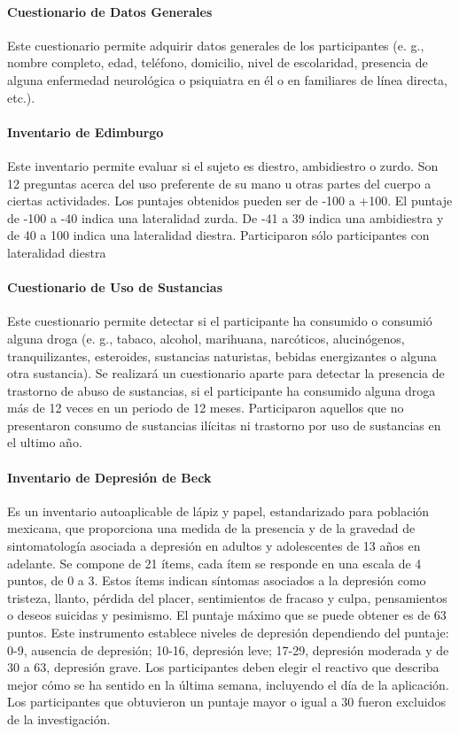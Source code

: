 \documentclass[12pt,letterpaper,final]{article}
\let\cite\cite %
\begin{document}
\paragraph{Cuestionario de Datos Generales} Este cuestionario permite adquirir datos generales de los participantes (e. g., nombre completo, edad, teléfono, domicilio, nivel de escolaridad, presencia de alguna enfermedad neurológica o psiquiatra en él o en familiares de línea directa, etc.).

\paragraph[Inventario de Edimburgo]{Inventario de Edimburgo \cite{Oldfield1971}} Este inventario permite evaluar si el sujeto es diestro, ambidiestro o zurdo. Son 12 preguntas acerca del uso preferente de su mano u otras partes del cuerpo a ciertas actividades. Los puntajes obtenidos pueden ser de -100 a +100. El puntaje de -100 a -40 indica una lateralidad zurda. De -41 a 39 indica una ambidiestra y de 40 a 100 indica una lateralidad diestra. Participaron sólo participantes con lateralidad diestra

\paragraph{Cuestionario de Uso de Sustancias} Este cuestionario permite detectar si el participante ha consumido o consumió alguna droga (e. g., tabaco, alcohol, marihuana, narcóticos, alucinógenos, tranquilizantes, esteroides, sustancias naturistas, bebidas energizantes o alguna otra sustancia). Se realizará un cuestionario aparte para detectar la presencia de trastorno de abuso de sustancias, si el participante ha consumido alguna droga más de 12 veces en un periodo de 12 meses. Participaron aquellos que no presentaron consumo de sustancias ilícitas ni trastorno por uso de sustancias en el ultimo año. %

\paragraph[Inventario de Depresión de Beck]{Inventario de Depresión de Beck \cite{Jurado1998}} Es un inventario autoaplicable de lápiz y papel, estandarizado para población mexicana, que proporciona una medida de la presencia y de la gravedad de sintomatología asociada a depresión en adultos y adolescentes de 13 años en adelante. Se compone de 21 ítems, cada ítem se responde en una escala de 4 puntos, de 0 a 3. Estos ítems indican síntomas asociados a la depresión como tristeza, llanto, pérdida del placer, sentimientos de fracaso y culpa, pensamientos o deseos suicidas y pesimismo. El puntaje máximo que se puede obtener es de 63 puntos. Este instrumento establece niveles de depresión dependiendo del puntaje: 0-9, ausencia de depresión; 10-16, depresión leve; 17-29, depresión moderada y de 30 a 63, depresión grave. Los participantes deben elegir el reactivo que describa mejor cómo se ha sentido en la última semana, incluyendo el día de la aplicación. Los participantes que obtuvieron un puntaje mayor o igual a 30 fueron excluidos de la investigación.
\end{document}
